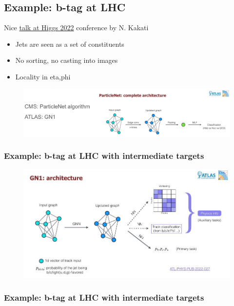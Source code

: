\subsection{Example: b-tag at LHC}
Nice \href{https://indico.cern.ch/event/1086716/contributions/5052326/attachments/2543061/4379499/flavor_tagging_HLLHC_nilotpal.pdf}{talk at Higgs 2022} conference by N. Kakati 

\begin{itemize}
	\item Jets are seen as a set of constituents
	\item No sorting, no casting into images
	\item Locality in eta,phi
\end{itemize}

\begin{figure}[ht]
	\centering
	\includegraphics[width=0.9\linewidth]{figure_ml/btag}
\end{figure}
\FloatBarrier


\subsubsection{Example: b-tag at LHC with intermediate targets}

\begin{figure}[ht]
	\centering
	\includegraphics[width=0.8\linewidth]{figure_ml/example_btag}
\end{figure}
\FloatBarrier


\subsubsection{Example: b-tag at LHC with intermediate targets}

